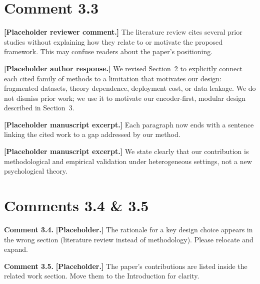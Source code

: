 \section{Comment 3.3}
\begin{reviewercomment}
\textbf{[Placeholder reviewer comment.]} The literature review cites several prior studies without explaining how they relate to or motivate the proposed framework. This may confuse readers about the paper's positioning.
\end{reviewercomment}

\begin{refsegment}
\begin{authorresponse}
\textbf{[Placeholder author response.]} We revised Section~2 to explicitly connect each cited family of methods to a limitation that motivates our design: fragmented datasets, theory dependence, deployment cost, or data leakage. We do not dismiss prior work; we use it to motivate our encoder-first, modular design described in Section~3.
\end{authorresponse}

\begin{authorchange}

\textbf{[Placeholder manuscript excerpt.]} Each paragraph now ends with a sentence linking the cited work to a gap addressed by our method.

\SplitChangeSection


\textbf{[Placeholder manuscript excerpt.]} We state clearly that our contribution is methodological and empirical validation under heterogeneous settings, not a new psychological theory.
\end{authorchange}
\RRSectionBibliography
\end{refsegment}

\section{Comments 3.4 \& 3.5}
\begin{reviewercomment}
\noindent\textbf{Comment 3.4.}
\textbf{[Placeholder.]} The rationale for a key design choice appears in the wrong section (literature review instead of methodology). Please relocate and expand.

\noindent\textbf{Comment 3.5.}
\textbf{[Placeholder.]} The paper's contributions are listed inside the related work section. Move them to the Introduction for clarity.
\end{reviewercomment}

